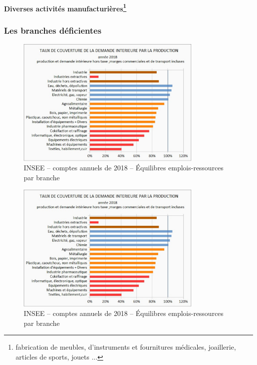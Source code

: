 \documentclass[a4paper]{article}
\begin{document}
\paragraph{Diverses activités manufacturières\protect\footnote{fabrication de meubles, d’instruments et fournitures médicales, joaillerie, articles de sports, jouets ...}}

\subsubsection{Les branches déficientes}

\begin{figure}[H]
    \centering
    \includegraphics*[width=0.8\textwidth]{images/couverture}
    \caption{INSEE – comptes annuels de 2018 – Équilibres emplois-ressources par branche}
    \label{fig:couverture}
\end{figure}

\begin{figure}[H]
    \centering
    \includegraphics*[width=0.8\textwidth]{images/couverture}
    \caption{INSEE – comptes annuels de 2018 – Équilibres emplois-ressources par branche}
    \label{fig:couverture}
\end{figure}
\end{document}
